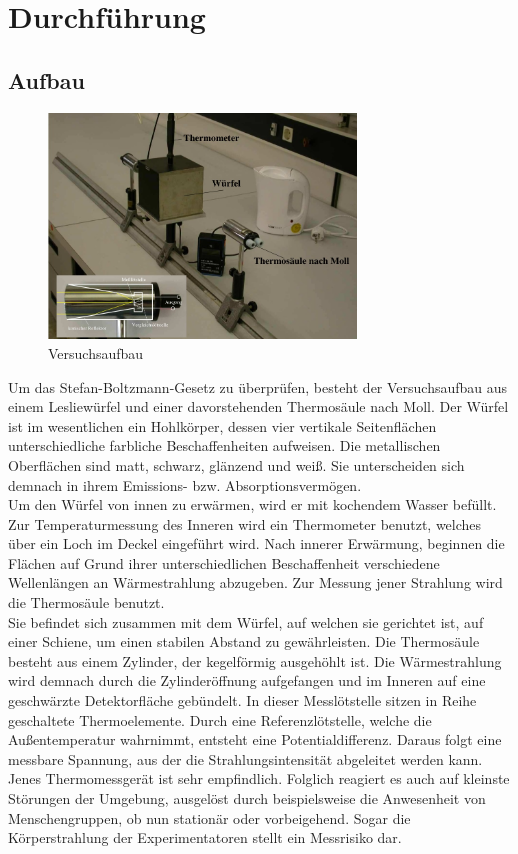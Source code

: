 \section{Durchführung}
\label{sec:Durchführung}
\subsection{Aufbau}
\begin{figure}[H]
  \centering
  \includegraphics[height=6cm]{Leslie.png}
  \caption{Versuchsaufbau \cite{sample}}
  \label{fig:skizze}
\end{figure}
Um das Stefan-Boltzmann-Gesetz zu überprüfen, besteht der Versuchsaufbau aus einem Lesliewürfel und einer davorstehenden Thermosäule nach Moll.
Der Würfel ist im wesentlichen ein Hohlkörper, dessen vier vertikale Seitenflächen unterschiedliche farbliche Beschaffenheiten aufweisen.
Die metallischen Oberflächen sind matt, schwarz, glänzend und weiß.
Sie unterscheiden sich demnach in ihrem Emissions- bzw. Absorptionsvermögen.\\
Um den Würfel von innen zu erwärmen, wird er mit kochendem Wasser befüllt.
Zur Temperaturmessung des Inneren wird ein Thermometer benutzt, welches über ein Loch im Deckel eingeführt wird.
Nach innerer Erwärmung, beginnen die Flächen auf Grund ihrer unterschiedlichen Beschaffenheit verschiedene Wellenlängen an Wärmestrahlung abzugeben.
Zur Messung jener Strahlung wird die Thermosäule benutzt.\\
Sie befindet sich zusammen mit dem Würfel, auf welchen sie gerichtet ist, auf einer Schiene, um einen stabilen Abstand zu gewährleisten.
Die Thermosäule besteht aus einem Zylinder, der kegelförmig ausgehöhlt ist.
Die Wärmestrahlung wird demnach durch die Zylinderöffnung aufgefangen und im Inneren auf eine geschwärzte Detektorfläche gebündelt.
In dieser Messlötstelle sitzen in Reihe geschaltete Thermoelemente.
Durch eine Referenzlötstelle, welche die Außentemperatur wahrnimmt, entsteht eine Potentialdifferenz.
Daraus folgt eine messbare Spannung, aus der die Strahlungsintensität abgeleitet werden kann.\\
Jenes Thermomessgerät ist sehr empfindlich.
Folglich reagiert es auch auf kleinste Störungen der Umgebung, ausgelöst durch beispielsweise die Anwesenheit von Menschengruppen, ob nun stationär oder vorbeigehend.
Sogar die Körperstrahlung der Experimentatoren stellt ein Messrisiko dar.

